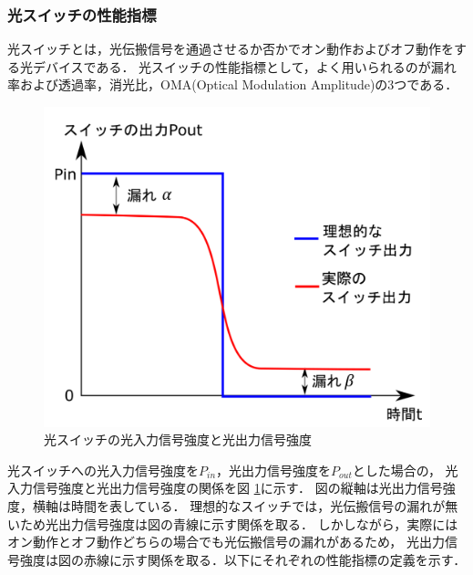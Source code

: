 \subsubsection{光スイッチの性能指標}
光スイッチとは，光伝搬信号を通過させるか否かでオン動作およびオフ動作をする光デバイスである．
光スイッチの性能指標として，よく用いられるのが漏れ率および透過率，消光比，OMA(Optical Modulation Amplitude)の3つである．
\begin{figure}[t!]
\begin{center}
\includegraphics[keepaspectratio,scale=0.4]{fig/3/swichout.pdf}
\caption{光スイッチの光入力信号強度と光出力信号強度}
\label{fig:swichout}
\end{center}
\end{figure}
光スイッチへの光入力信号強度を$P_{in}$，光出力信号強度を$P_{out}$とした場合の，
光入力信号強度と光出力信号強度の関係を図 \ref{fig:swichout}に示す．
図の縦軸は光出力信号強度，横軸は時間を表している．
理想的なスイッチでは，光伝搬信号の漏れが無いため光出力信号強度は図の青線に示す関係を取る．
しかしながら，実際にはオン動作とオフ動作どちらの場合でも光伝搬信号の漏れがあるため，
光出力信号強度は図の赤線に示す関係を取る．以下にそれぞれの性能指標の定義を示す．
